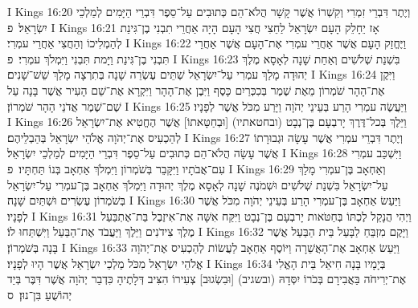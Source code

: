 I Kings 16:20	וְיֶתֶר דִּבְרֵי זִמְרִי וְקִשְׁרוֹ אֲשֶׁר קָשָׁר הֲלֹא־הֵם כְּתוּבִים עַל־סֵפֶר דִּבְרֵי הַיָּמִים לְמַלְכֵי יִשְׂרָאֵל׃ {פ}
I Kings 16:21	אָז יֵחָלֵק הָעָם יִשְׂרָאֵל לַחֵצִי חֲצִי הָעָם הָיָה אַחֲרֵי תִבְנִי בֶן־גִּינַת לְהַמְלִיכוֹ וְהַחֲצִי אַחֲרֵי עמְרִי׃
I Kings 16:22	וַיֶּחֱזַק הָעָם אֲשֶׁר אַחֲרֵי עמְרִי אֶת־הָעָם אֲשֶׁר אַחֲרֵי תִּבְנִי בֶן־גִּינַת וַיָּמת תִּבְנִי וַיִּמְלֹךְ עמְרִי׃ {פ}
I Kings 16:23	בִּשְׁנַת שְׁלֹשִׁים וְאַחַת שָׁנָה לְאָסָא מֶלֶךְ יְהוּדָה מָלַךְ עמְרִי עַל־יִשְׂרָאֵל שְׁתֵּים עֶשְׂרֵה שָׁנָה בְּתִרְצָה מָלַךְ שֵׁשׁ־שָׁנִים׃
I Kings 16:24	וַיִּקֶן אֶת־הָהָר שֹׁמְרוֹן מֵאֶת שֶׁמֶר בְּכִכְּרַיִם כָּסֶף וַיִּבֶן אֶת־הָהָר וַיִּקְרָא אֶת־שֵׁם הָעִיר אֲשֶׁר בָּנָה עַל שֶׁם־שֶׁמֶר אֲדֹנֵי הָהָר שֹׁמְרוֹן׃
I Kings 16:25	וַיַּעֲשֶׂה עמְרִי הָרַע בְּעֵינֵי יְהֹוָה וַיָּרַע מִכֹּל אֲשֶׁר לְפָנָיו׃
I Kings 16:26	וַיֵּלֶךְ בְּכל־דֶּרֶךְ יָרבְעָם בֶּן־נְבָט (ובחטאתיו) [וּבְחַטָּאתוֹ] אֲשֶׁר הֶחֱטִיא אֶת־יִשְׂרָאֵל לְהַכְעִיס אֶת־יְהֹוָה אֱלֹהֵי יִשְׂרָאֵל בְּהַבְלֵיהֶם׃
I Kings 16:27	וְיֶתֶר דִּבְרֵי עמְרִי אֲשֶׁר עָשָׂה וּגְבוּרָתוֹ אֲשֶׁר עָשָׂה הֲלֹא־הֵם כְּתוּבִים עַל־סֵפֶר דִּבְרֵי הַיָּמִים לְמַלְכֵי יִשְׂרָאֵל׃
I Kings 16:28	וַיִּשְׁכַּב עמְרִי עִם־אֲבֹתָיו וַיִּקָּבֵר בְּשֹׁמְרוֹן וַיִּמְלֹךְ אַחְאָב בְּנוֹ תַּחְתָּיו׃ {פ}
I Kings 16:29	וְאַחְאָב בֶּן־עמְרִי מָלַךְ עַל־יִשְׂרָאֵל בִּשְׁנַת שְׁלֹשִׁים וּשְׁמֹנֶה שָׁנָה לְאָסָא מֶלֶךְ יְהוּדָה וַיִּמְלֹךְ אַחְאָב בֶּן־עמְרִי עַל־יִשְׂרָאֵל בְּשֹׁמְרוֹן עֶשְׂרִים וּשְׁתַּיִם שָׁנָה׃
I Kings 16:30	וַיַּעַשׂ אַחְאָב בֶּן־עמְרִי הָרַע בְּעֵינֵי יְהֹוָה מִכֹּל אֲשֶׁר לְפָנָיו׃
I Kings 16:31	וַיְהִי הֲנָקֵל לֶכְתּוֹ בְּחַטֹּאות יָרבְעָם בֶּן־נְבָט וַיִּקַּח אִשָּׁה אֶת־אִיזֶבֶל בַּת־אֶתְבַּעַל מֶלֶךְ צִידֹנִים וַיֵּלֶךְ וַיַּעֲבֹד אֶת־הַבַּעַל וַיִּשְׁתַּחוּ לוֹ׃
I Kings 16:32	וַיָּקֶם מִזְבֵּחַ לַבָּעַל בֵּית הַבַּעַל אֲשֶׁר בָּנָה בְּשֹׁמְרוֹן׃
I Kings 16:33	וַיַּעַשׂ אַחְאָב אֶת־הָאֲשֵׁרָה וַיּוֹסֶף אַחְאָב לַעֲשׂוֹת לְהַכְעִיס אֶת־יְהֹוָה אֱלֹהֵי יִשְׂרָאֵל מִכֹּל מַלְכֵי יִשְׂרָאֵל אֲשֶׁר הָיוּ לְפָנָיו׃
I Kings 16:34	בְּיָמָיו בָּנָה חִיאֵל בֵּית הָאֱלִי אֶת־יְרִיחֹה בַּאֲבִירָם בְּכֹרוֹ יִסְּדָהּ (ובשגיב) [וּבִשְׂגוּב] צְעִירוֹ הִצִּיב דְּלָתֶיהָ כִּדְבַר יְהֹוָה אֲשֶׁר דִּבֶּר בְּיַד יְהוֹשֻׁעַ בִּן־נוּן׃ {ס}        
